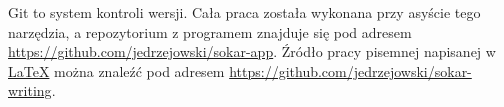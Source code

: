 \par
Git to system kontroli wersji.
Cała praca została wykonana przy asyście tego narzędzia, a repozytorium z programem znajduje się pod adresem \url{https://github.com/jedrzejowski/sokar-app}.
Źródło pracy pisemnej napisanej w \href{https://www.latex-project.org/}{LaTeX} można znaleźć pod adresem \url{https://github.com/jedrzejowski/sokar-writing}.